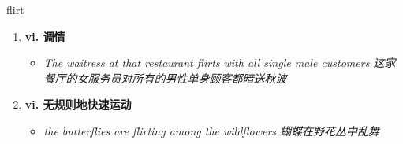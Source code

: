 
\begin{frame}
{\huge flirt}
\begin{center}
\begin{enumerate}\Large
  \item \textbf{vi. 调情}
  \begin{itemize}
    \item \em{\Large{The waitress at that restaurant flirts with all single male customers 这家餐厅的女服务员对所有的男性单身顾客都暗送秋波}}
  \end{itemize}
  \item \textbf{vi. 无规则地快速运动}
  \begin{itemize}
    \item \em{\Large{the butterflies are flirting among the wildflowers 蝴蝶在野花丛中乱舞}}
  \end{itemize}
\end{enumerate}
\end{center}
\end{frame}
